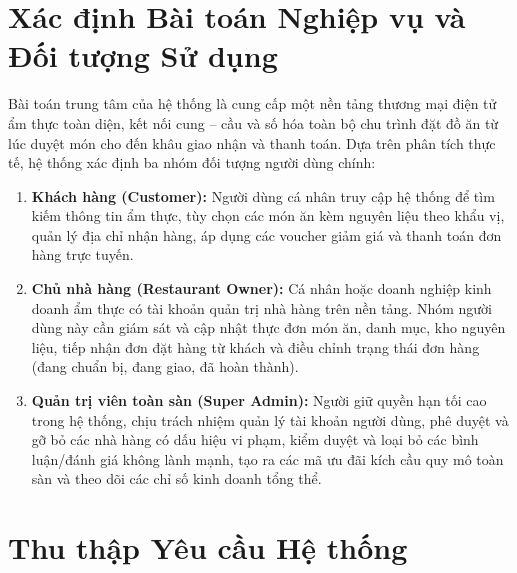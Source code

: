 \documentclass{uetgraduation}
\begin{document}
\section{Xác định Bài toán Nghiệp vụ và Đối tượng Sử dụng}
Bài toán trung tâm của hệ thống là cung cấp một nền tảng thương mại điện tử ẩm thực toàn diện, kết nối cung -- cầu và số hóa toàn bộ chu trình đặt đồ ăn từ lúc duyệt món cho đến khâu giao nhận và thanh toán. Dựa trên phân tích thực tế, hệ thống xác định ba nhóm đối tượng người dùng chính:
\begin{enumerate}
    \item \textbf{Khách hàng (Customer):} Người dùng cá nhân truy cập hệ thống để tìm kiếm thông tin ẩm thực, tùy chọn các món ăn kèm nguyên liệu theo khẩu vị, quản lý địa chỉ nhận hàng, áp dụng các voucher giảm giá và thanh toán đơn hàng trực tuyến.
    \item \textbf{Chủ nhà hàng (Restaurant Owner):} Cá nhân hoặc doanh nghiệp kinh doanh ẩm thực có tài khoản quản trị nhà hàng trên nền tảng. Nhóm người dùng này cần giám sát và cập nhật thực đơn món ăn, danh mục, kho nguyên liệu, tiếp nhận đơn đặt hàng từ khách và điều chỉnh trạng thái đơn hàng (đang chuẩn bị, đang giao, đã hoàn thành).
    \item \textbf{Quản trị viên toàn sàn (Super Admin):} Người giữ quyền hạn tối cao trong hệ thống, chịu trách nhiệm quản lý tài khoản người dùng, phê duyệt và gỡ bỏ các nhà hàng có dấu hiệu vi phạm, kiểm duyệt và loại bỏ các bình luận/đánh giá không lành mạnh, tạo ra các mã ưu đãi kích cầu quy mô toàn sàn và theo dõi các chỉ số kinh doanh tổng thể.
\end{enumerate}

\section{Thu thập Yêu cầu Hệ thống}
\end{document}

